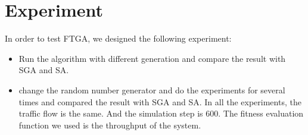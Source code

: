 \documentclass{article} %
\begin{document}
\section{Experiment}
In order to test FTGA, we designed the following experiment:
\begin{itemize}
	\item Run the algorithm with different generation and compare the result with SGA and SA.
	\item change the random number generator and do the experiments for several times and compared the result with SGA and SA.
	In all the experiments, the traffic flow is the same. And the simulation step is 600. The fitness evaluation function we used is the throughput of the system.
	
\end{itemize}
\end{document}
